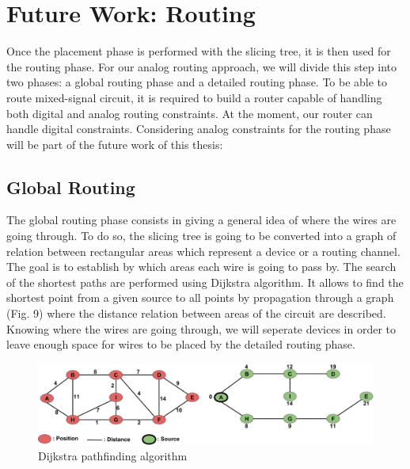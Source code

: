 \chapter{Future Work: Routing}

Once the placement phase is performed with the slicing tree, it is then used for the routing phase. For our analog routing approach, we will divide this step into two phases: a global routing phase and a detailed routing phase. To be able to route mixed-signal circuit, it is required to build a router capable of handling both digital and analog routing constraints. At the moment, our router can handle digital constraints. Considering analog constraints for the routing phase will be part of the future work of this thesis:


\section{Global Routing}
The global routing phase consists in giving a general idea of where the wires are going through. To do so, the slicing tree is going to be converted into a graph of relation between rectangular areas which represent a device or a routing channel. The goal is to establish by which areas each wire is going to pass by. 
\newline 
\newline 
\indent The search of the shortest paths are performed using Dijkstra algorithm. It allows to find the shortest point from a given source to all points by propagation through a graph (Fig. 9) where the distance relation between areas of the circuit are described. Knowing where the wires are going through, we will seperate devices in order to leave enough space for wires to be placed by the detailed routing phase.
\begin{figure}[h]
\begin{center}
\includegraphics[width=160mm]{Figures/6.png}
\caption{Dijkstra pathfinding algorithm}
\end{center}
\end{figure}
\vspace{-1cm}
